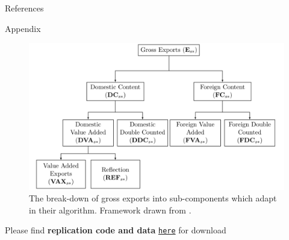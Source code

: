 \documentclass[10pt]{beamer}
\begin{document}
\begin{frame}[allowframebreaks]{References} %
  
  
\end{frame}

\appendix

\begin{frame}[allowframebreaks]{Appendix}
\begin{figure}
    \centering
    \includegraphics[scale = 0.28]{decomposition.PNG}
    \tiny{\caption{The break-down of gross exports into sub-components which \cite{borin2019measuring} adapt in their algorithm. Framework drawn from \cite{koopman2014tracing}.}}
    \label{fig:7}
\end{figure}

Please find \textbf{replication code and data} \texttt{\href{https://github.com/gerodasbach/Trade-Policy-Analysis}{here}} for download
\end{frame}
\end{document}

